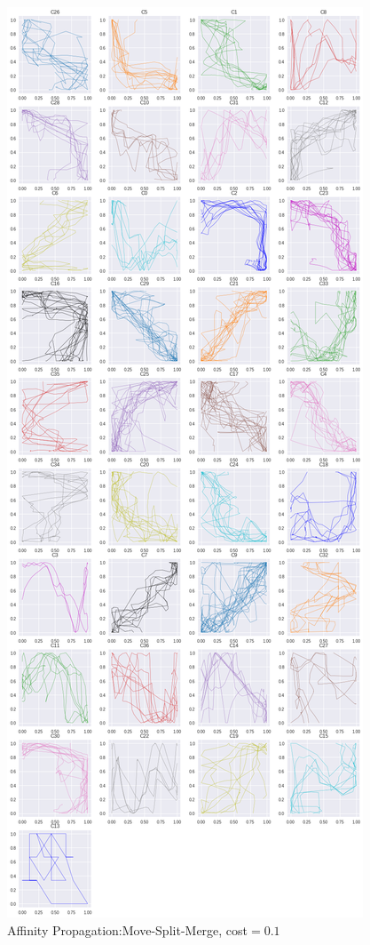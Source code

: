 \begin{figure}[h]
  \centering
  \includegraphics[width=\linewidth,height=\textheight,keepaspectratio]{figs/clusters/CLU_AP_ALL[MSM;c=.1].png}
  \caption{Affinity Propagation:Move-Split-Merge, cost$=0.1$}
\end{figure}


